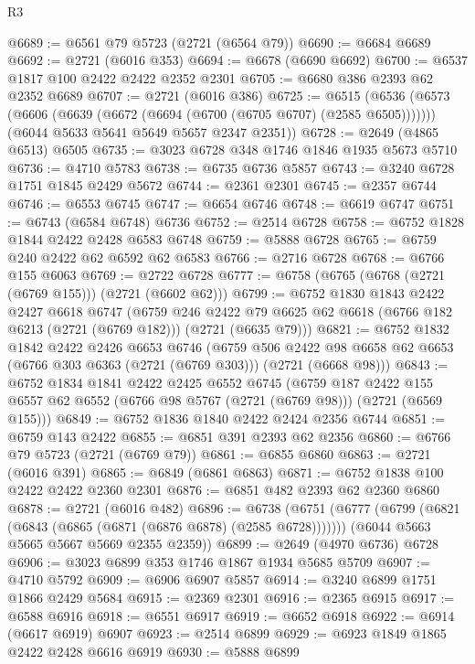 \begin{lexlean}{R3}
\begin{coremodule}
@6689 := @6561 @79 @5723 (@2721 (@6564 @79))
@6690 := @6684 @6689
@6692 := @2721 (@6016 @353)
@6694 := @6678 (@6690 @6692)
@6700 := @6537 @1817 @100 @2422 @2422 @2352 @2301
@6705 := @6680 @386 @2393 @62 @2352 @6689
@6707 := @2721 (@6016 @386)
@6725 := @6515
    (@6536
      (@6573 (@6606 (@6639 (@6672 (@6694 (@6700 (@6705 @6707) (@2585 @6505)))))))
      (@6044 @5633 @5641 @5649 @5657 @2347 @2351))
@6728 := @2649 (@4865 @6513) @6505
@6735 := @3023 @6728 @348 @1746 @1846 @1935 @5673 @5710
@6736 := @4710 @5783
@6738 := @6735 @6736 @5857
@6743 := @3240 @6728 @1751 @1845 @2429 @5672
@6744 := @2361 @2301
@6745 := @2357 @6744
@6746 := @6553 @6745
@6747 := @6654 @6746
@6748 := @6619 @6747
@6751 := @6743 (@6584 @6748) @6736
@6752 := @2514 @6728
@6758 := @6752 @1828 @1844 @2422 @2428 @6583 @6748
@6759 := @5888 @6728
@6765 := @6759 @240 @2422 @62 @6592 @62 @6583
@6766 := @2716 @6728
@6768 := @6766 @155 @6063
@6769 := @2722 @6728
@6777 := @6758 (@6765 (@6768 (@2721 (@6769 @155))) (@2721 (@6602 @62)))
@6799 := @6752
    @1830
    @1843
    @2422
    @2427
    @6618
    @6747
    (@6759
      @246
      @2422
      @79
      @6625
      @62
      @6618
      (@6766 @182 @6213 (@2721 (@6769 @182)))
      (@2721 (@6635 @79)))
@6821 := @6752
    @1832
    @1842
    @2422
    @2426
    @6653
    @6746
    (@6759
      @506
      @2422
      @98
      @6658
      @62
      @6653
      (@6766 @303 @6363 (@2721 (@6769 @303)))
      (@2721 (@6668 @98)))
@6843 := @6752
    @1834
    @1841
    @2422
    @2425
    @6552
    @6745
    (@6759
      @187
      @2422
      @155
      @6557
      @62
      @6552
      (@6766 @98 @5767 (@2721 (@6769 @98)))
      (@2721 (@6569 @155)))
@6849 := @6752 @1836 @1840 @2422 @2424 @2356 @6744
@6851 := @6759 @143 @2422
@6855 := @6851 @391 @2393 @62 @2356
@6860 := @6766 @79 @5723 (@2721 (@6769 @79))
@6861 := @6855 @6860
@6863 := @2721 (@6016 @391)
@6865 := @6849 (@6861 @6863)
@6871 := @6752 @1838 @100 @2422 @2422 @2360 @2301
@6876 := @6851 @482 @2393 @62 @2360 @6860
@6878 := @2721 (@6016 @482)
@6896 := @6738
    (@6751
      (@6777 (@6799 (@6821 (@6843 (@6865 (@6871 (@6876 @6878) (@2585 @6728)))))))
      (@6044 @5663 @5665 @5667 @5669 @2355 @2359))
@6899 := @2649 (@4970 @6736) @6728
@6906 := @3023 @6899 @353 @1746 @1867 @1934 @5685 @5709
@6907 := @4710 @5792
@6909 := @6906 @6907 @5857
@6914 := @3240 @6899 @1751 @1866 @2429 @5684
@6915 := @2369 @2301
@6916 := @2365 @6915
@6917 := @6588 @6916
@6918 := @6551 @6917
@6919 := @6652 @6918
@6922 := @6914 (@6617 @6919) @6907
@6923 := @2514 @6899
@6929 := @6923 @1849 @1865 @2422 @2428 @6616 @6919
@6930 := @5888 @6899

\end{coremodule}
\end{lexlean}
